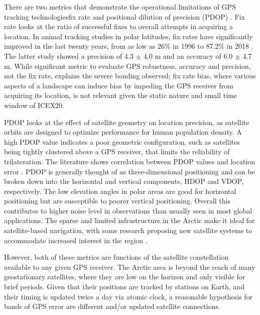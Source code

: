 There are two metrics that demonstrate the operational limitations of GPS tracking technologies\textemdash fix rate and positional dilution of precision (PDOP) \citep{swanlund_gps_2016}.
Fix rate looks at the ratio of successful fixes to overall attempts in acquiring a location.
In animal tracking studies in polar latitudes, fix rates have significantly improved in the last twenty years, from as low as 26\% in 1996\citep{moen_effects_1996} to 87.2\% in 2018 \citep{jung_accuracy_2018}.
The latter study showed a precision of 4.3 $\pm$ 4.0 m and an accuracy of 6.0 $\pm$ 4.7 m.
While significant metric to evaluate GPS robustness, accuracy and precision, not the fix rate, explains the severe banding observed; fix rate bias, where various aspects of a landscape can induce bias by impeding the GPS receiver from acquiring its location, is not relevant given the static nature and small time window of ICEX20.

PDOP looks at the effect of satellite geometry on location precision, as satellite orbits are designed to optimize performance for human population density.
A high PDOP value indicates a poor geometric configuration, such as satellites being tightly clustered above a GPS receiver, that limits the reliability of trilateration.
The literature shows correlation between PDOP values and location error \citep{swanlund_gps_2016}.
PDOP is generally thought of as three-dimensional positioning and can be broken down into the horizontal and vertical components, HDOP and VDOP, respectively.
The low elevation angles in polar areas are good for horizontal positioning but are susceptible to poorer vertical positioning.
Overall this contributes to higher noise level in observations than usually seen in most global applications.
The sparse and limited infrastructure in the Arctic make it ideal for satellite-based navigation, with some research proposing new satellite systems to accommodate increased interest in the region \citep{reid_gnss_2016}.

However, both of these metrics are functions of the satellite constellation available to any given GPS receiver.
The Arctic area is beyond the reach of many geostationary satellites, where they are low on the horizon and only visible for brief periods.
Given that their positions are tracked by stations on Earth, and their timing is updated twice a day via atomic clock, a reasonable hypothesis for bands of GPS error are different and/or updated satellite connections.

